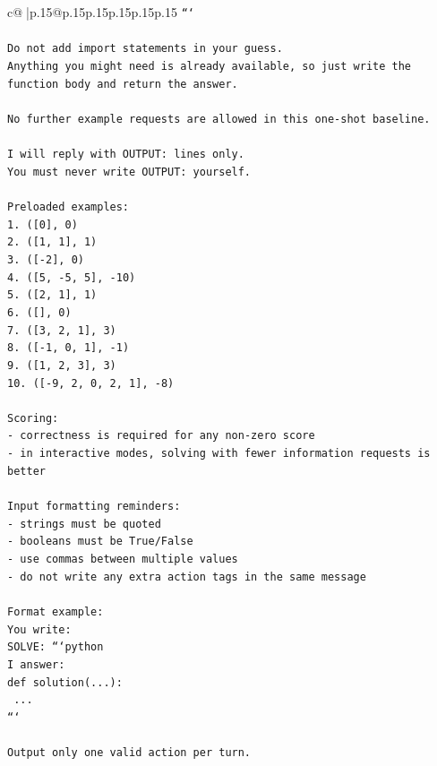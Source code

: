 \documentclass{article}
\begin{document}
{\begin{supertabular}{c@{$\;$}|p{.15\linewidth}@{}p{.15\linewidth}p{.15\linewidth}p{.15\linewidth}p{.15\linewidth}p{.15\linewidth}}
{{{\texttt{```} \\
\\ 
\texttt{Do not add import statements in your guess.} \\
\texttt{Anything you might need is already available, so just write the function body and return the answer.} \\
\\ 
\texttt{No further example requests are allowed in this one{-}shot baseline.} \\
\\ 
\texttt{I will reply with OUTPUT: lines only.} \\
\texttt{You must never write OUTPUT: yourself.} \\
\\ 
\texttt{Preloaded examples:} \\
\texttt{1. ({[}0{]}, 0)} \\
\texttt{2. ({[}1, 1{]}, 1)} \\
\texttt{3. ({[}{-}2{]}, 0)} \\
\texttt{4. ({[}5, {-}5, 5{]}, {-}10)} \\
\texttt{5. ({[}2, 1{]}, 1)} \\
\texttt{6. ({[}{]}, 0)} \\
\texttt{7. ({[}3, 2, 1{]}, 3)} \\
\texttt{8. ({[}{-}1, 0, 1{]}, {-}1)} \\
\texttt{9. ({[}1, 2, 3{]}, 3)} \\
\texttt{10. ({[}{-}9, 2, 0, 2, 1{]}, {-}8)} \\
\\ 
\texttt{Scoring:} \\
\texttt{{-} correctness is required for any non{-}zero score} \\
\texttt{{-} in interactive modes, solving with fewer information requests is better} \\
\\ 
\texttt{Input formatting reminders:} \\
\texttt{{-} strings must be quoted} \\
\texttt{{-} booleans must be True/False} \\
\texttt{{-} use commas between multiple values} \\
\texttt{{-} do not write any extra action tags in the same message} \\
\\ 
\texttt{Format example:} \\
\texttt{You write:} \\
\texttt{SOLVE: ```python} \\
\texttt{I answer:} \\
\texttt{def solution(...):} \\
\texttt{    ...} \\
\texttt{```} \\
\\ 
\texttt{Output only one valid action per turn.} \\
            }
        }
    }
     \\ \\


\end{supertabular}}
\end{document}
